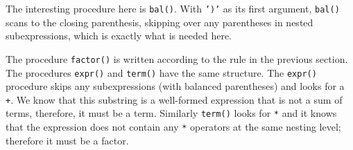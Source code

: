 
The interesting procedure here is \texttt{bal()}. With
\texttt{')'} as its first argument,
\texttt{bal()} scans to the closing parenthesis, skipping over any
parentheses in nested subexpressions, which is exactly what is needed
here.

The procedure \texttt{factor()} is written according to the rule in the
previous section. The procedures \texttt{expr()} and \texttt{term()}
have the same structure. The \texttt{expr()} procedure skips any
subexpressions (with balanced parentheses) and looks for a \texttt{+}.
We know that this substring is a well-formed expression that is not a
sum of terms, therefore, it must be a term. Similarly \texttt{term()}
looks for \texttt{*} and it knows that the expression does not contain
any \texttt{*} operators at the same nesting level; therefore it must
be a factor.

